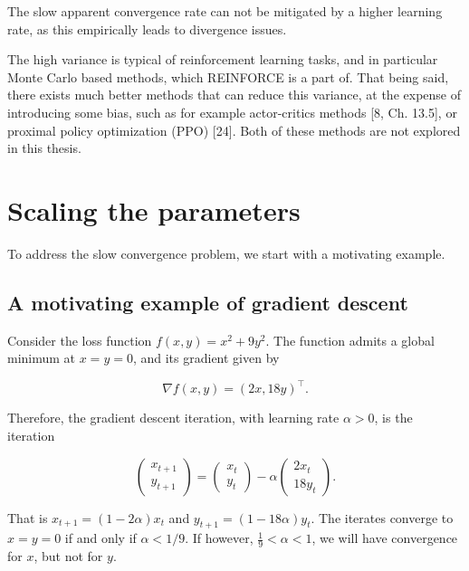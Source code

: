 \documentclass[
  letterpaper,
]{report}
\theoremstyle{plain}
\theoremstyle{definition}
\theoremstyle{definition}
\theoremstyle{remark}
\begin{document}
The slow apparent convergence rate can not be mitigated by a higher
learning rate, as this empirically leads to divergence issues.

The high variance is typical of reinforcement learning tasks, and in
particular Monte Carlo based methods, which REINFORCE is a part of. That
being said, there exists much better methods that can reduce this
variance, at the expense of introducing some bias, such as for example
actor-critics methods {[}8, Ch. 13.5{]}, or proximal policy optimization
(PPO) {[}24{]}. Both of these methods are not explored in this thesis.

\hypertarget{scaling-the-parameters}{%
\section{Scaling the parameters}\label{scaling-the-parameters}}

To address the slow convergence problem, we start with a motivating
example.

\hypertarget{a-motivating-example-of-gradient-descent}{%
\subsection{A motivating example of gradient
descent}\label{a-motivating-example-of-gradient-descent}}

Consider the loss function \(f(x,y) = x^2 + 9y^2\). The function admits
a global minimum at \(x = y = 0\), and its gradient given by

\[
\nabla f(x,y) = (2x,18y)^\intercal.
\]

Therefore, the gradient descent iteration, with learning rate
\(\alpha>0\), is the iteration

\[
\begin{pmatrix}
x_{t+1}\\
y_{t+1}
\end{pmatrix} = \begin{pmatrix}
x_t\\
y_t
\end{pmatrix} - \alpha \begin{pmatrix}
2x_t\\
18y_t
\end{pmatrix}.
\]

That is \(x_{t+1} = (1-2\alpha)x_t\) and \(y_{t+1} = (1-18\alpha)y_t\).
The iterates converge to \(x=y=0\) if and only if \(\alpha<1/9\). If
however, \(\frac{1}{9}<\alpha<1\), we will have convergence for \(x\),
but not for \(y\).
\end{document}

